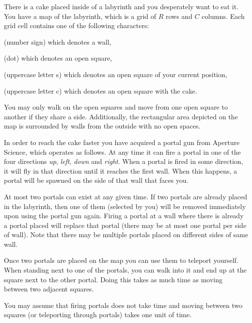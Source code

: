 \documentclass{boi2014}
\newcommand{\constant}[1]{{\tt #1}}
\begin{document}
    There is a cake placed inside of a labyrinth and you desperately want to eat
    it. You have a map of the labyrinth, which is a grid of $R$ rows and $C$
    columns.  Each grid cell contains one of the following characters:
    \begin{description}[itemindent=1pt]
    	\item[\constant{\#}] (number sign) which denotes a wall,
        \item[\constant{.}] (dot) which denotes an open square,
        \item[\constant{S}] (uppercase letter s) which denotes an open square of
        your current position,
        \item[\constant{C}] (uppercase letter c) which denotes an open square
        with the cake.
    \end{description}
    You may only walk on the open squares and move from one open square to
    another if they share a side. Additionally, the rectangular area depicted on
    the map is surrounded by walls from the outside with no open spaces.

    In order to reach the cake faster you have acquired a portal gun from
    Aperture Science\texttrademark{}, which operates as follows.
    At any time it can fire a portal in one of the four directions
    \emph{up}, \emph{left}, \emph{down} and \emph{right}.
    When a portal is fired in some direction, it will fly in that direction
    until it reaches the first wall. When this happens, a portal
    will be spawned on the side of that wall that faces you.

    At most two portals can exist at any given time. If two portals are already
    placed in the labyrinth, then one of them (selected by you) will be removed
    immediately upon using the portal gun again. Firing a portal at a wall where
    there is already a portal placed will replace that portal (there may be at
    most one portal per side of wall).  Note that there may be multiple portals
    placed on different sides of same wall.

    Once two portals are placed on the map you can use them to
    teleport yourself. When standing next to one of the portals,
    you can walk into it and end up at the square next to the other
    portal. Doing this takes as much time as moving between two
    adjacent squares.

    You may assume that firing portals does not take time and moving
    between two squares (or teleporting through portals) takes one unit
    of time.
\end{document}
